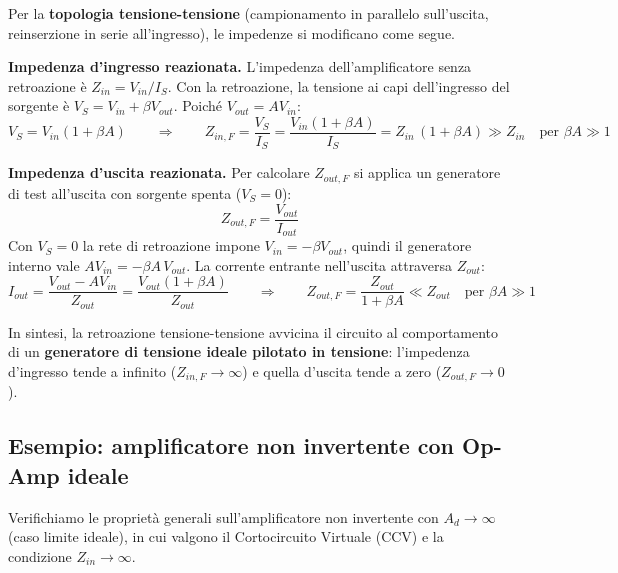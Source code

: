 \noindent
Per la \textbf{topologia tensione-tensione} (campionamento in parallelo sull'uscita, reinserzione in serie all'ingresso), le impedenze si modificano come segue.

\medskip
\noindent
\textbf{Impedenza d'ingresso reazionata.} L'impedenza dell'amplificatore senza retroazione è $Z_{in} = V_{in}/I_S$. Con la retroazione, la tensione ai capi dell'ingresso del sorgente è $V_S = V_{in} + \beta V_{out}$. Poiché $V_{out} = A V_{in}$:
\[
    V_S = V_{in}(1 + \beta A) \qquad \Longrightarrow \qquad
    Z_{in,F} = \frac{V_S}{I_S} = \frac{V_{in}(1 + \beta A)}{I_S} = Z_{in}\,(1 + \beta A) \gg Z_{in} \quad \text{per } \beta A \gg 1
\]

\medskip
\noindent
\textbf{Impedenza d'uscita reazionata.} Per calcolare $Z_{out,F}$ si applica un generatore di test all'uscita con sorgente spenta ($V_S = 0$):
\[
    Z_{out,F} = \frac{V_{out}}{I_{out}}
\]
Con $V_S = 0$ la rete di retroazione impone $V_{in} = -\beta V_{out}$, quindi il generatore interno vale $A V_{in} = -\beta A\, V_{out}$. La corrente entrante nell'uscita attraversa $Z_{out}$:
\[
    I_{out} = \frac{V_{out} - A V_{in}}{Z_{out}} = \frac{V_{out}(1 + \beta A)}{Z_{out}}
    \qquad\Longrightarrow\qquad
    Z_{out,F} = \frac{Z_{out}}{1 + \beta A} \ll Z_{out} \quad \text{per } \beta A \gg 1
\]

\medskip
\noindent
In sintesi, la retroazione tensione-tensione avvicina il circuito al comportamento di un \textbf{generatore di tensione ideale pilotato in tensione}: l'impedenza d'ingresso tende a infinito ($Z_{in,F} \to \infty$) e quella d'uscita tende a zero ($Z_{out,F} \to 0$).

\subsection*{Esempio: amplificatore non invertente con Op-Amp ideale}

Verifichiamo le proprietà generali sull'amplificatore non invertente con $A_d \to \infty$ (caso limite ideale), in cui valgono il Cortocircuito Virtuale (CCV) e la condizione $Z_{in} \to \infty$.

